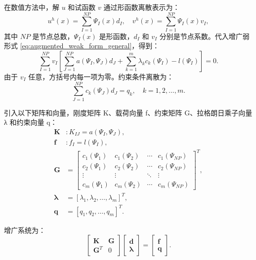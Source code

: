 \documentclass[engineeringmaster]{hquThesis}
\begin{document}
在数值方法中，解 \( u \) 和试函数 \( v \) 通过形函数离散表示为：
\begin{equation}
u^h(x) = \sum_{I=1}^{NP} \Psi_I(x) d_I, \quad v^h(x) = \sum_{I=1}^{NP} \Psi_I(x) v_I,
\label{eq:discrete_u_general}
\end{equation}
其中 \( NP \) 是节点总数，\( \Psi_I(x) \) 是形函数，\( d_I \) 和 \( v_I \) 分别是节点系数。代入增广弱形式 \eqref{eq:augmented_weak_form_general}，得到：
\begin{equation}
\sum_{I=1}^{NP} v_I \left[ \sum_{J=1}^{NP} a(\Psi_I, \Psi_J) d_J + \sum_{k=1}^m \lambda_k c_k(\Psi_I) - l(\Psi_I) \right] = 0.
\label{eq:discrete_augmented_weak_form}
\end{equation}
由于 \( v_I \) 任意，方括号内每一项为零。约束条件离散为：
\begin{equation}
\sum_{J=1}^{NP} c_k(\Psi_J) d_J = q_k, \quad k = 1, 2, \ldots, m.
\label{eq:discrete_constraints_general}
\end{equation}

引入以下矩阵和向量，刚度矩阵 {K}、载荷向量 {f}、约束矩阵 {G}、拉格朗日乘子向量 {λ} 和约束向量 {q}：
\begin{equation}
\begin{aligned}
\boldsymbol{K} &: K_{IJ} = a(\Psi_I, \Psi_J), \\
\boldsymbol{f} &: f_I = l(\Psi_I), \\
\boldsymbol{G} &= \begin{bmatrix} 
c_1(\Psi_1) & c_1(\Psi_2) & \cdots & c_1(\Psi_{NP}) \\ 
c_2(\Psi_1) & c_2(\Psi_2) & \cdots & c_2(\Psi_{NP}) \\ 
\vdots & \vdots & \ddots & \vdots \\ 
c_m(\Psi_1) & c_m(\Psi_2) & \cdots & c_m(\Psi_{NP})
\end{bmatrix}^T, \\
\boldsymbol{\lambda} &= [\lambda_1, \lambda_2, \ldots, \lambda_m]^T, \\
\boldsymbol{q} &= [q_1, q_2, \ldots, q_m]^T.
\end{aligned}
\label{eq:compact_definitions_matrices}
\end{equation}

增广系统为：
\begin{equation}
\begin{bmatrix}
\boldsymbol{K} & \boldsymbol{G} \\
\boldsymbol{G}^T & 0
\end{bmatrix}
\begin{bmatrix}
\boldsymbol{d} \\
\boldsymbol{\lambda}
\end{bmatrix}
=
\begin{bmatrix}
\boldsymbol{f} \\
\boldsymbol{q}
\end{bmatrix}.
\label{eq:augmented_system_general}
\end{equation}
\end{document}
